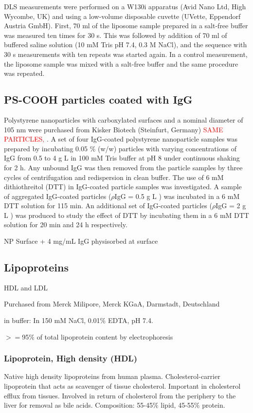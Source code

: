 DLS measurements were performed on a W130i apparatus (Avid Nano Ltd, High Wycombe, UK) and using a low-volume disposable cuvette (UVette, Eppendorf Austria GmbH). First, 70 ml of the liposome sample prepared in a salt-free buffer was measured ten times for 30 s. This was followed by addition of 70 ml of buffered saline solution (10 mM Tris pH 7.4, 0.3 M NaCl), and the sequence with 30 s measurements with ten repeats was started again. In a control measurement, the liposome sample was mixed with a salt-free buffer and the same procedure was repeated. 

\subsection{PS-COOH particles coated with IgG}

Polystyrene nanoparticles with carboxylated surfaces and a nominal diameter of 105 nm were purchased from Kisker Biotech (Steinfurt, Germany) \textcolor{red}{SAME PARTICLES, \cite{minelli_characterization_2014}}. A set of four IgG-coated polystyrene nanoparticle samples was prepared by incubating 0.05 $\%$ (w/w) particles with varying concentrations of IgG from 0.5 to 4 g L in 100 mM Tris buffer at pH 8 under continuous shaking for 2 h. Any unbound IgG was then removed from the particle samples by three cycles of centrifugation and redispersion in clean buffer. The use of 6 mM dithiothreitol (DTT) in IgG-coated particle samples was investigated. A sample of aggregated IgG-coated particles ($\rho$IgG = 0.5 g L ) was incubated in a 6 mM DTT solution for 115 min. An additional set of IgG-coated particles ($\rho$IgG = 2 g L ) was produced to study the effect of DTT by incubating them in a 6 mM DTT solution for 20 min and 24 h respectively.


NP Surface + 4 mg/mL IgG physisorbed at surface



\subsection{Lipoproteins}
HDL and LDL

Purchased from Merck Milipore, Merck KGaA, Darmstadt, Deutschland

in buffer: In 150 mM NaCl, 0.01$\%$ EDTA, pH 7.4. 

$>=$95$\%$ of total lipoprotein content by electrophoresis 

\subsubsection{Lipoprotein, High density (HDL)}
Native high density lipoproteins from human plasma. Cholesterol-carrier lipoprotein that acts as scavenger of tissue cholesterol. Important in cholesterol efflux from tissues. Involved in return of cholesterol from the periphery to the liver for removal as bile acids. Composition: 55-45$\%$ lipid, 45-55$\%$ protein.

